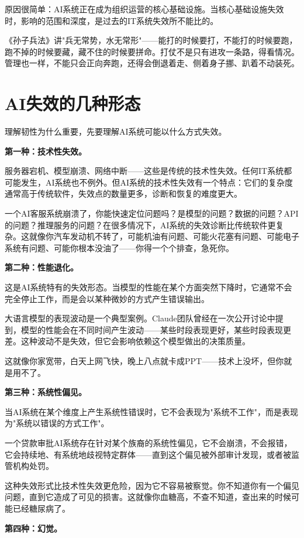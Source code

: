 原因很简单：AI系统正在成为组织运营的核心基础设施。当核心基础设施失效时，影响的范围和深度，是过去的IT系统失效所不能比的。

《孙子兵法》讲"兵无常势，水无常形"——能打的时候要打，不能打的时候要跑，跑不掉的时候要藏，藏不住的时候要拼命。打仗不是只有进攻一条路，得看情况。管理也一样，不能只会正向奔跑，还得会倒退着走、侧着身子挪、趴着不动装死。

\section{AI失效的几种形态}


理解韧性为什么重要，先要理解AI系统可能以什么方式失效。

\textbf{第一种：技术性失效。}

服务器宕机、模型崩溃、网络中断——这些是传统的技术性失效。任何IT系统都可能发生，AI系统也不例外。但AI系统的技术性失效有一个特点：它们的复杂度通常高于传统软件，失效点的数量更多，诊断和恢复的难度更大。

一个AI客服系统崩溃了，你能快速定位问题吗？是模型的问题？数据的问题？API的问题？推理服务的问题？在很多情况下，AI系统的失效诊断比传统软件更复杂。这就像你汽车发动机不转了，可能机油有问题、可能火花塞有问题、可能电子系统有问题、可能你根本没油了——你得一个个排查，急死你。

\textbf{第二种：性能退化。}

这是AI系统特有的失效形态。当模型的性能在某个方面突然下降时，它通常不会完全停止工作，而是会以某种微妙的方式产生错误输出。

大语言模型的表现波动是一个典型案例。Claude团队曾经在一次公开讨论中提到，模型的性能会在不同时间产生波动——某些时段表现更好，某些时段表现更差。这种波动不是失效，但它会影响依赖这个模型做出的决策质量。

这就像你家宽带，白天上网飞快，晚上八点就卡成PPT——技术上没坏，但你就是用不了。

\textbf{第三种：系统性偏见。}

当AI系统在某个维度上产生系统性错误时，它不会表现为"系统不工作"，而是表现为"系统以错误的方式工作"。

一个贷款审批AI系统存在针对某个族裔的系统性偏见，它不会崩溃，不会报错，它会持续地、有系统地歧视特定群体——直到这个偏见被外部审计发现，或者被监管机构处罚。

这种失效形式比技术性失效更危险，因为它不容易被察觉。你不知道你有一个偏见问题，直到它造成了可见的损害。这就像你血糖高，不查不知道，查出来的时候可能已经糖尿病了。

\textbf{第四种：幻觉。}

